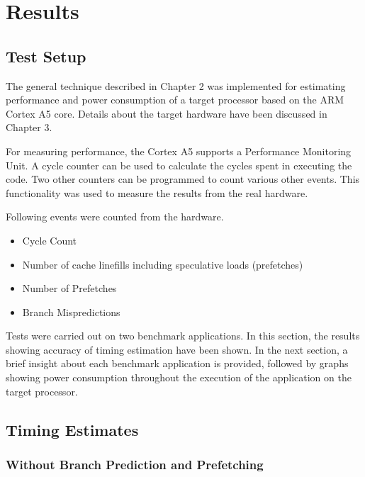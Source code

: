 \chapter{Results}

\section{Test Setup}
The general technique described in Chapter 2 was implemented for estimating performance and power consumption of a target processor based on the ARM Cortex A5 core. Details about the target hardware have been discussed in Chapter 3.

For measuring performance, the Cortex A5 supports a Performance Monitoring Unit. A cycle counter can be used to calculate the cycles spent in executing the code. Two other counters can be programmed to count various other events. This functionality was used to measure the results from the real hardware. 

Following events were counted from the hardware.

\begin{itemize} \itemsep -4pt
\item Cycle Count
\item Number of cache linefills including speculative loads (prefetches)
\item Number of Prefetches
\item Branch Mispredictions
\end{itemize}

Tests were carried out on two benchmark applications. In this section, the results showing accuracy of timing estimation have been shown. In the next section, a brief insight about each benchmark application is provided, followed by graphs showing power consumption throughout the execution of the application on the target processor. 

\section{Timing Estimates}

\subsection{Without Branch Prediction and Prefetching}

